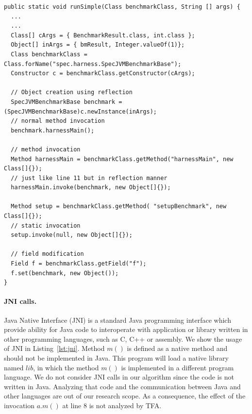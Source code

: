 \documentclass{fac}
\begin{document}
\begin{minipage}{\linewidth}
\vspace{10pt}
\begin{lstlisting}[caption={Example code of reflection},label={lst:reflection}]
public static void runSimple(Class benchmarkClass, String [] args) {
  ...
  ...
  Class[] cArgs = { BenchmarkResult.class, int.class };
  Object[] inArgs = { bmResult, Integer.valueOf(1)};
  Class benchmarkClass = Class.forName("spec.harness.SpecJVMBenchmarkBase");
  Constructor c = benchmarkClass.getConstructor(cArgs);

  // Object creation using reflection
  SpecJVMBenchmarkBase benchmark = (SpecJVMBenchmarkBase)c.newInstance(inArgs);
  // normal method invocation
  benchmark.harnessMain();

  // method invocation
  Method harnessMain = benchmarkClass.getMethod("harnessMain", new Class[]{});
  // just like line 11 but in reflection manner
  harnessMain.invoke(benchmark, new Object[]{});

  Method setup = benchmarkClass.getMethod( "setupBenchmark", new Class[]{});
  // static invocation
  setup.invoke(null, new Object[]{});

  // field modification
  Field f = benchmarkClass.getField("f");
  f.set(benchmark, new Object());
}
\end{lstlisting}
\end{minipage}

\paragraph{JNI calls.} Java Native Interface (JNI) is a standard Java programming interface which provide ability for Java code to interoperate with application or library written in other programming languages, such as C, C++ or assembly. We show the usage of JNI in Listing~\ref{lst:jni}. Method $m()$ is defined as a native method and should not be implemented in Java. This program will load a native library named $lib$, in which the method $m()$ is implemented in a different program language. We do not consider JNI calls in our algorithm since the code is not written in Java. Analyzing that code and the communication between Java and other languages are out of our research scope. As a consequence, the effect of the invocation $a.m()$ at line $8$ is not analyzed by TFA.
\end{document}
